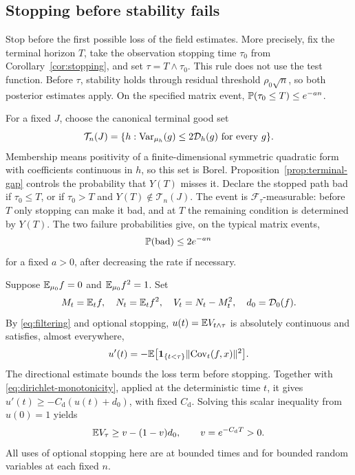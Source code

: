 \subsection{Stopping before stability fails}
Stop before the first possible loss of the field estimates. More precisely,
fix the terminal horizon $T$, take the observation stopping time $\tau_0$
from Corollary~\ref{cor:stopping}, and set $\tau=T\wedge\tau_0$. This
rule does not use the test function. Before $\tau$, stability holds through
residual threshold $\rho_0\sqrt n$, so both posterior estimates apply.
On the specified matrix event, $\mathbb P(\tau_0\le T)\le e^{-an}$.

For a fixed $J$, choose the canonical terminal good set
\[
 \mathcal T_n(J)=\{h:\operatorname{Var}_{\mu_h}(g)\le2\mathcal D_h(g)\text{ for every }g\}.
\]
Membership means positivity of a finite-dimensional symmetric quadratic
form with coefficients continuous in $h$, so this set is Borel.
Proposition~\ref{prop:terminal-gap} controls the probability that $Y(T)$
misses it. Declare the stopped path bad if $\tau_0\le T$, or if
$\tau_0>T$ and $Y(T)\notin\mathcal T_n(J)$. The event is
$\mathcal F_\tau$-measurable: before $T$ only stopping can make it bad,
and at $T$ the remaining condition is determined by $Y(T)$. The two
failure probabilities give, on the typical matrix events,
\begin{equation}\label{eq:ordinary-bad}
 \mathbb P(\mathrm{bad})\le 2e^{-a n}
\end{equation}
for a fixed $a>0$, after decreasing the rate if necessary.

Suppose $\mathbb E_{\mu_0}f=0$ and $\mathbb E_{\mu_0}f^2=1$. Set
\[
 M_t=\mathbb E_t f,\quad N_t=\mathbb E_t f^2,\quad V_t=N_t-M_t^2,
 \quad d_0=\mathcal D_0(f).
\]
By \eqref{eq:filtering} and optional stopping, $u(t)=\mathbb E V_{t\wedge\tau}$ is
absolutely continuous and satisfies, almost everywhere,
\[
 u'(t)=-\mathbb E\bigl[\mathbf 1_{\{t<\tau\}}\lVert \operatorname{Cov}_t(f,x)\rVert^2\bigr].
\]
The directional estimate bounds the loss term before stopping. Together
with \eqref{eq:dirichlet-monotonicity}, applied at the deterministic time
$t$, it gives $u'(t)\ge-C_{\mathrm d}(u(t)+d_0)$, with fixed
$C_{\mathrm d}$. Solving this scalar inequality from $u(0)=1$ yields
\begin{equation}\label{eq:variance-lower}
 \mathbb E V_\tau\ge v-(1-v)d_0,\qquad v=e^{-C_{\mathrm d}T}>0.
\end{equation}
All uses of optional stopping here are at bounded times and for bounded
random variables at each fixed $n$.

